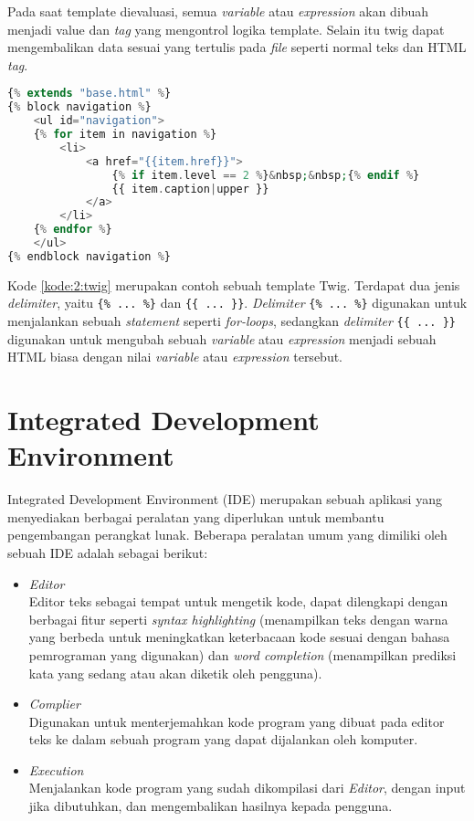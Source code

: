 Pada saat template dievaluasi, semua \textit{variable} atau \textit{expression} akan dibuah menjadi value dan \textit{tag} yang mengontrol logika template. Selain itu twig dapat mengembalikan data sesuai yang tertulis pada \textit{file} seperti normal teks dan HTML \textit{tag}.

\begin{lstlisting}[language={php}, caption={Contoh template Twig}, label={kode:2:twig}]
{% extends "base.html" %}
{% block navigation %}
	<ul id="navigation">
	{% for item in navigation %}
		<li>
			<a href="{{item.href}}">
				{% if item.level == 2 %}&nbsp;&nbsp;{% endif %}
				{{ item.caption|upper }}
			</a>
		</li>
	{% endfor %}
	</ul>
{% endblock navigation %}
\end{lstlisting}

Kode \ref{kode:2:twig} merupakan contoh sebuah template Twig. Terdapat dua jenis \textit{delimiter}, yaitu \verb|{% ... %}| dan \verb|{{ ... }}|. \textit{Delimiter} \verb|{% ... %}| digunakan untuk menjalankan sebuah \textit{statement} seperti \textit{for-loops}, sedangkan \textit{delimiter} \verb|{{ ... }}| digunakan untuk mengubah sebuah \textit{variable} atau \textit{expression} menjadi sebuah HTML biasa dengan nilai \textit{variable} atau \textit{expression} tersebut.

\section{Integrated Development Environment}
\label{sec:2:ide}

Integrated Development Environment (IDE) merupakan sebuah aplikasi yang menyediakan berbagai peralatan yang diperlukan untuk membantu pengembangan perangkat lunak. Beberapa peralatan umum yang dimiliki oleh sebuah IDE adalah sebagai berikut:

\begin{itemize}
	\item \textit{Editor} \\
	      Editor teks sebagai tempat untuk mengetik kode, dapat dilengkapi dengan berbagai fitur seperti \textit{syntax highlighting} (menampilkan teks dengan warna yang berbeda untuk meningkatkan keterbacaan kode sesuai dengan bahasa pemrograman yang digunakan) dan \textit{word completion} (menampilkan prediksi kata yang sedang atau akan diketik oleh pengguna).
	\item \textit{Complier} \\
	      Digunakan untuk menterjemahkan kode program yang dibuat pada editor teks ke dalam sebuah program yang dapat dijalankan oleh komputer.
	\item \textit{Execution} \\
	      Menjalankan kode program yang sudah dikompilasi dari \textit{Editor}, dengan input jika dibutuhkan, dan mengembalikan hasilnya kepada pengguna.
\end{itemize}


